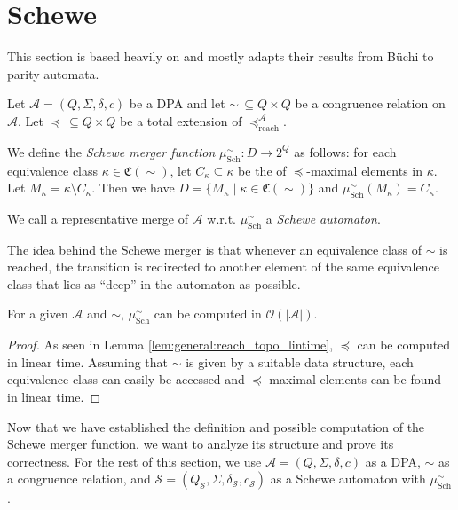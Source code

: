 
\section{Schewe}
\label{sect:schewe}

This section is based heavily on \cite{Schewe2010} and mostly adapts their results from B\"uchi to parity automata.

\begin{defn}
	Let $\mathcal{A} = (Q, \Sigma, \delta, c)$ be a DPA and let $\sim \,\subseteq Q \times Q$ be a congruence relation on $\mathcal{A}$. Let $\preceq \,\subseteq Q \times Q$ be a total extension of $\preceq_\text{reach}^\mathcal{A}$. 
	
	We define the \emph{Schewe merger function} $\mu_\text{Sch}^\sim : D \rightarrow 2^Q$ as follows: for each equivalence class $\kappa \in \mathfrak{C}(\sim)$, let $C_\kappa \subseteq \kappa$ be the of $\preceq$-maximal elements in $\kappa$. Let $M_\kappa = \kappa \setminus C_\kappa$. Then we have $D = \{ M_\kappa \mid \kappa \in \mathfrak{C}(\sim) \}$ and $\mu_\text{Sch}^\sim(M_\kappa) = C_\kappa$.
	
	We call a representative merge of $\mathcal{A}$ w.r.t. $\mu_\text{Sch}^\sim$ a \emph{Schewe automaton}.
\end{defn}

The idea behind the Schewe merger is that whenever an equivalence class of $\sim$ is reached, the transition is redirected to another element of the same equivalence class that lies as \enquote{deep} in the automaton as possible.

\begin{lem}
\label{lem:schewe:schewe_aut_linear_time}
	For a given $\mathcal{A}$ and $\sim$, $\mu_\text{Sch}^\sim$ can be computed in $\mathcal{O}(|\mathcal{A}|)$.
\end{lem}

\begin{proof}
	As seen in Lemma \ref{lem:general:reach_topo_lintime}, $\preceq$ can be computed in linear time. Assuming that $\sim$ is given by a suitable data structure, each equivalence class can easily be accessed and $\preceq$-maximal elements can be found in linear time.
\end{proof}

\vspace{10pt}

Now that we have established the definition and possible computation of the Schewe merger function, we want to analyze its structure and prove its correctness. For the rest of this section, we use $\mathcal{A} = (Q, \Sigma, \delta, c)$ as a DPA, $\sim$ as a congruence relation, and $\mathcal{S} = (Q_\mathcal{S}, \Sigma, \delta_\mathcal{S}, c_\mathcal{S})$ as a Schewe automaton with $\mu_\text{Sch}^\sim$.

